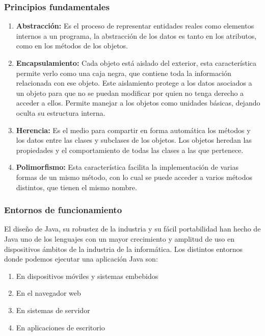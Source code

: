 \subsubsection{Principios fundamentales}
\begin{enumerate}
\item \textbf{Abstracción:}
Es el proceso de representar entidades reales como elementos internos a un programa, la abstracción de los datos es tanto en los atributos, como en los métodos de los objetos.
\item \textbf{Encapsulamiento:}
Cada objeto está aislado del exterior, esta característica permite verlo como una caja negra, que contiene toda la información relacionada con ese objeto. Este aislamiento protege a los datos asociados a un objeto para que no se puedan modificar por quien no tenga derecho a acceder a ellos.
Permite manejar a los objetos como unidades básicas, dejando oculta su estructura interna.
\item \textbf{Herencia:}
Es el medio para compartir en forma automática los métodos y los datos entre las clases y subclases de los objetos. Los objetos heredan las propiedades y el comportamiento de todas las clases a las que pertenece.
\item \textbf{Polimorfismo:}
Esta característica facilita la implementación de varias formas de un mismo método, con lo cual se puede acceder a varios métodos distintos, que tienen el mismo nombre. \cite{JAVA}
\end{enumerate}
\subsubsection{Entornos de funcionamiento}
	
El diseño de Java, su robustez de la industria y su fácil portabilidad han hecho de Java uno de los lenguajes con un mayor crecimiento y amplitud de uso en dispositivos ámbitos de la industria de la informática. Los distintos entornos donde podemos ejecutar una aplicación Java son:
\begin{enumerate}
\item	En dispositivos móviles y sistemas embebidos
\item	En el navegador web
\item	En sistemas de servidor
\item	En aplicaciones de escritorio
\end{enumerate}
